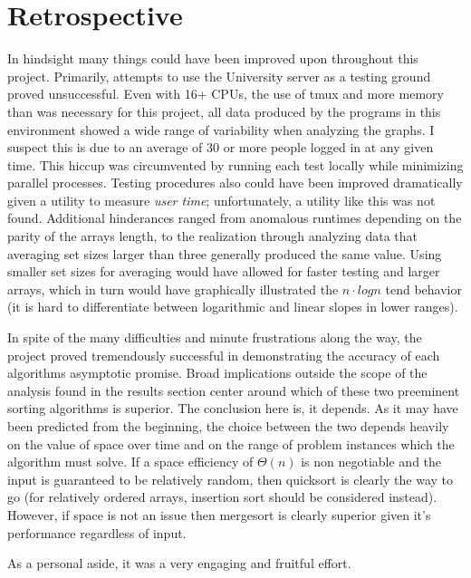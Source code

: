 \documentclass[11pt,letterpaper]{report}
\begin{document}
\section*{Retrospective} %
In hindsight many things could have been improved upon throughout this project. Primarily, attempts to use the University server as a testing ground proved unsuccessful. Even with 16+ CPUs, the use of tmux and more memory than was necessary for this project, all data produced by the programs in this environment showed a wide range of variability when analyzing the graphs. I suspect this is due to an average of 30 or more people logged in at any given time. This hiccup was circumvented by running each test locally while minimizing parallel processes. Testing procedures also could have been improved dramatically given a utility to measure \emph{user time}; unfortunately, a utility like this was not found. Additional hinderances ranged from anomalous runtimes depending on the parity of the arrays length, to the realization through analyzing data that averaging set sizes larger than three generally produced the same value. Using smaller set sizes for averaging would have allowed for faster testing and larger arrays, which in turn would have graphically illustrated the $n \cdot log{}n$ tend behavior (it is hard to differentiate between logarithmic and linear slopes in lower ranges).

In spite of the many difficulties and minute frustrations along the way, the project proved tremendously successful in demonstrating the accuracy of each algorithms asymptotic promise. Broad implications outside the scope of the analysis found in the results section center around which of these two preeminent sorting algorithms is superior. The conclusion here is, it depends. As it may have been predicted from the beginning, the choice between the two depends heavily on the value of space over time and on the range of problem instances which the algorithm must solve. If a space efficiency of $\Theta(n)$ is non negotiable and the input is guaranteed to be relatively random, then quicksort is clearly the way to go (for relatively ordered arrays, insertion sort should be considered instead). However, if space is not an issue then mergesort is clearly superior given it's performance regardless of input. 

As a personal aside, it was a very engaging and fruitful effort. 
\end{document}
